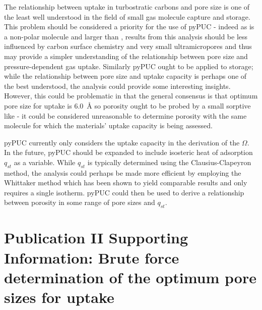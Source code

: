 The relationship between  uptake in \glspl{turbostratic carbon} and pore size is one of the least well understood in the field of small gas molecule capture and storage.\citep{Matranga1992Molecular, Tan1990Adsorption, Simon2015materials, Biloe2002Optimal} This problem should be considered a priority for the use of pyPUC - indeed as  is a non-polar molecule and larger than ,\citep{Breck1974Zeolite, Poling2001Properties} results from this analysis should be less influenced by carbon surface chemistry and very small \glspl{ultramicropore} and thus may provide a simpler understanding of the relationship between pore size and pressure-dependent gas uptake. Similarly pyPUC ought to be applied to  storage; while the relationship between pore size and  uptake capacity is perhaps one of the best understood, the analysis could provide some interesting insights. However, this could be problematic in that the general consensus is that optimum pore size for  uptake is \qty{6.0}{\angstrom}\citep{DelaCasaLillo2002Hydrogen, Cabria2007optimum} so porosity ought to be probed by a small sorptive like  - it could be considered unreasonable to determine porosity with the same molecule for which the materials' uptake capacity is being assessed.

pyPUC currently only considers the uptake capacity in the derivation of the $\Omega$. In the future, pyPUC should be expanded to include isosteric heat of \gls{adsorption} $q_{st}$ as a variable. While $q_{st}$ is typically determined using the Clausius-Clapeyron method,\citep{clausius1850ueber, clapeyron1834memoire} the analysis could perhaps be made more efficient by employing the Whittaker method which has been shown to yield comparable results and only requires a single isotherm.\citep{whittaker2013predicting, li2018adsorption} pyPUC could then be used to derive a relationship between porosity in some range of pore sizes and $q_{st}$.

\newpage
\section[Publication II Supporting Information]{\texorpdfstring{Publication II Supporting Information: Brute force determination of the optimum pore sizes for  uptake}{Publication III Supporting Information: Brute force determination of the optimum pore sizes for CO2 uptake}}

\setcounter{opagenum}{\thepage}

\newpage

\setlength{\originalVOffset}{\voffset}   
\setlength{\originalHOffset}{\hoffset}

\setlength{\voffset}{0cm}
\setlength{\hoffset}{0cm}

\setlength{\voffset}{\originalVOffset}
\setlength{\hoffset}{\originalHOffset}


